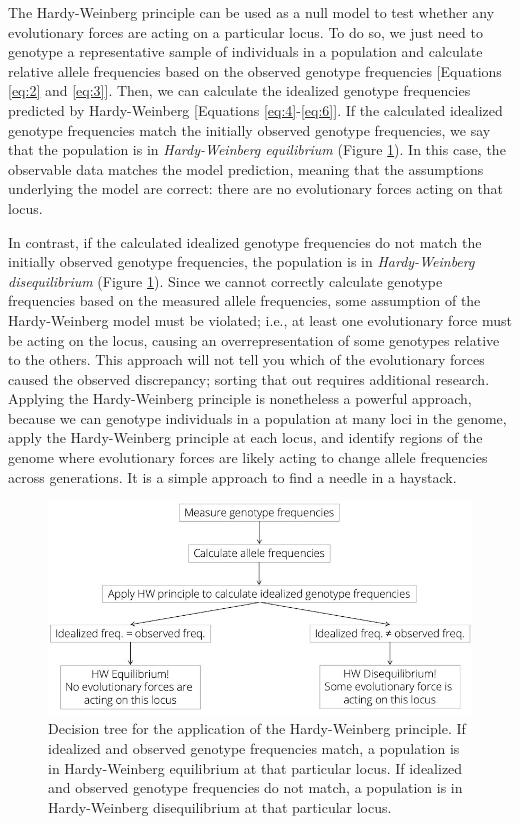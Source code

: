 \documentclass[
]{book}
\begin{document}
The Hardy-Weinberg principle can be used as a null model to test whether any evolutionary forces are acting on a particular locus. To do so, we just need to genotype a representative sample of individuals in a population and calculate relative allele frequencies based on the observed genotype frequencies {[}Equations \eqref{eq:2} and \eqref{eq:3}{]}. Then, we can calculate the idealized genotype frequencies predicted by Hardy-Weinberg {[}Equations \eqref{eq:4}-\eqref{eq:6}{]}. If the calculated idealized genotype frequencies match the initially observed genotype frequencies, we say that the population is in \emph{Hardy-Weinberg equilibrium} (Figure \ref{fig:decisiontree}). In this case, the observable data matches the model prediction, meaning that the assumptions underlying the model are correct: there are no evolutionary forces acting on that locus.

In contrast, if the calculated idealized genotype frequencies do not match the initially observed genotype frequencies, the population is in \emph{Hardy-Weinberg disequilibrium} (Figure \ref{fig:decisiontree}). Since we cannot correctly calculate genotype frequencies based on the measured allele frequencies, some assumption of the Hardy-Weinberg model must be violated; i.e., at least one evolutionary force must be acting on the locus, causing an overrepresentation of some genotypes relative to the others. This approach will not tell you which of the evolutionary forces caused the observed discrepancy; sorting that out requires additional research. Applying the Hardy-Weinberg principle is nonetheless a powerful approach, because we can genotype individuals in a population at many loci in the genome, apply the Hardy-Weinberg principle at each locus, and identify regions of the genome where evolutionary forces are likely acting to change allele frequencies across generations. It is a simple approach to find a needle in a haystack.

\begin{figure}
\includegraphics[width=1\linewidth]{images/HW_principle} \caption{Decision tree for the application of the Hardy-Weinberg principle. If idealized and observed genotype frequencies match, a population is in Hardy-Weinberg equilibrium at that particular locus. If idealized and observed genotype frequencies do not match, a population is in Hardy-Weinberg disequilibrium at that particular locus.}\label{fig:decisiontree}
\end{figure}
\end{document}
